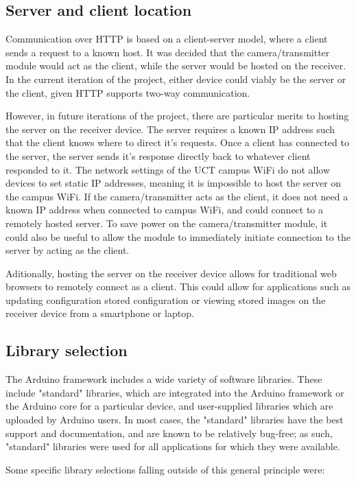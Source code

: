 \subsection{Server and client location}

Communication over HTTP is based on a client-server model, where a client sends a request to a known host. It was decided that the camera/transmitter module would act as the client, while the server would be hosted on the receiver. In the current iteration of the project, either device could viably be the server or the client, given HTTP supports two-way communication. 

However, in future iterations of the project, there are particular merits to hosting the server on the receiver device. The server requires a known IP address such that the client knows where to direct it's requests. Once a client has connected to the server, the server sends it's response directly back to whatever client responded to it. The network settings of the UCT campus WiFi do not allow devices to set static IP addresses, meaning it is impossible to host the server on the campus WiFi. If the camera/transmitter acts as the client, it does not need a known IP address when connected to campus WiFi, and could connect to a remotely hosted server. To save power on the camera/transmitter module, it could also be useful to allow the module to immediately initiate connection to the server by acting as the client. 

Aditionally, hosting the server on the receiver device allows for traditional web browsers to remotely connect as a client. This could allow for applications such as updating configuration stored configuration or viewing stored images on the receiver device from a smartphone or laptop.

\subsection{Library selection}

The Arduino framework includes a wide variety of software libraries. These include "standard" libraries, which are integrated into the Arduino framework or the Arduino core for a particular device, and user-supplied libraries which are uploaded by Arduino users. In most cases, the "standard" libraries have the best support and documentation, and are known to be relatively bug-free; as such, "standard" libraries were used for all applications for which they were available.

Some specific library selections falling outside of this general principle were:

